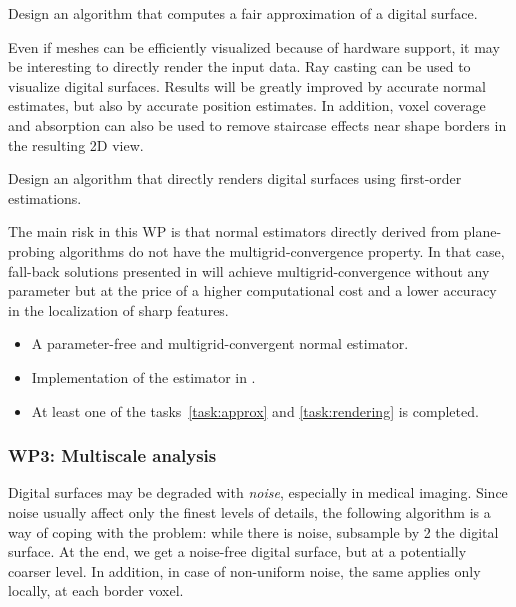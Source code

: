 \begin{Task}
  \label{task:approx}
  Design an algorithm that computes a fair approximation of a digital surface. 
\end{Task}

Even if meshes can be efficiently visualized because of hardware support,
it may be interesting to directly render the input data. Ray casting can be used to
visualize digital surfaces. Results will be greatly improved by accurate normal estimates,
but also by accurate position estimates. In addition, voxel coverage and absorption can
also be used to remove staircase effects near shape borders in the resulting 2D view.

\begin{Task}
  \label{task:rendering}
  Design an algorithm that directly renders digital surfaces using first-order estimations.  
\end{Task}

\Risks
The main risk in this WP is that normal estimators
directly derived from plane-probing algorithms do not have the multigrid-convergence
property. In that case, fall-back solutions presented in  will achieve
multigrid-convergence without any parameter but at the price of a higher computational
cost and a lower accuracy in the localization of sharp features. 

\Success
\begin{itemize}
  \item A parameter-free and multigrid-convergent normal estimator.
  \item Implementation of the estimator in \DGtal.
  \item At least one of the tasks~\ref{task:approx} and \ref{task:rendering} is completed. 
\end{itemize}

  
\subsubsection{WP3: Multiscale analysis}
\label{wpScale}


Digital surfaces may be degraded with \emph{noise}, especially in medical imaging.
Since noise usually affect only the finest levels of details, the following algorithm
is a way of coping with the problem: while there is noise, subsample by 2 the digital surface.
At the end, we get a noise-free digital surface, but at a potentially coarser level.
In addition, in case of non-uniform noise, the same applies only locally, \ie at each border voxel.  

